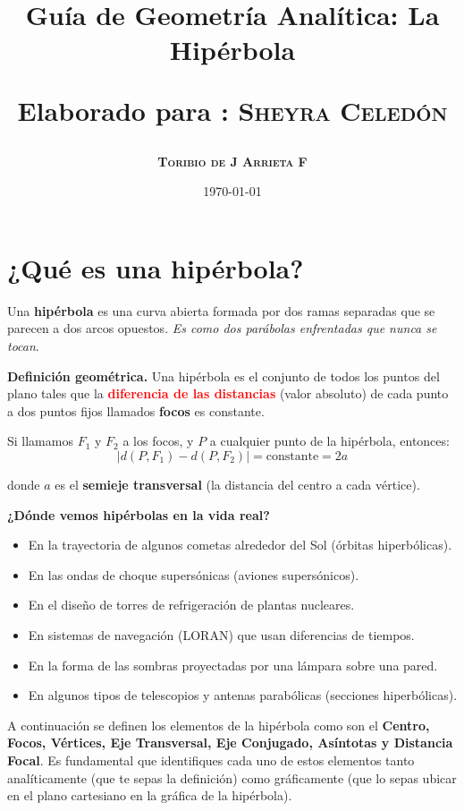 \documentclass[12pt,a4paper]{article}
\title{\Large Guía de Geometría Analítica: La Hipérbola

\small{Elaborado para : \textsc{\bf{Sheyra Celedón}}}}
\author{\bf{\textsc{Toribio de J Arrieta F}}}
\date{\today}
\begin{document}
	\maketitle

	\section{¿Qué es una hipérbola?}

	Una \textbf{hipérbola} es una curva abierta formada por dos ramas separadas que se parecen a dos arcos opuestos. \emph{Es como dos parábolas enfrentadas que nunca se tocan}.

	\bigskip

	\textbf{Definición geométrica.} Una hipérbola es el conjunto de todos los puntos del plano tales que la \textcolor{red}{\textbf{diferencia de las distancias}} (valor absoluto) de cada punto a dos puntos fijos llamados \textbf{focos} es constante.

	\bigskip

	Si llamamos $F_1$ y $F_2$ a los focos, y $P$ a cualquier punto de la hipérbola, entonces:
	\[
	|d(P,F_1)-d(P,F_2)|=\text{constante}=2a
	\]

	donde $a$ es el \textbf{semieje transversal} (la distancia del centro a cada vértice).

	\bigskip

	\textbf{¿Dónde vemos hipérbolas en la vida real?}
	\begin{itemize}
		\item En la trayectoria de algunos cometas alrededor del Sol (órbitas hiperbólicas).
		\item En las ondas de choque supersónicas (aviones supersónicos).
		\item En el diseño de torres de refrigeración de plantas nucleares.
		\item En sistemas de navegación (LORAN) que usan diferencias de tiempos.
		\item En la forma de las sombras proyectadas por una lámpara sobre una pared.
		\item En algunos tipos de telescopios y antenas parabólicas (secciones hiperbólicas).
	\end{itemize}

	\bigskip

	A continuación se definen los elementos de la hipérbola como son el \textbf{Centro, Focos, Vértices, Eje Transversal, Eje Conjugado, Asíntotas y Distancia Focal}. Es fundamental que identifiques cada uno de estos elementos tanto analíticamente (que te sepas la definición) como gráficamente (que lo sepas ubicar en el plano cartesiano en la gráfica de la hipérbola).
\end{document}
